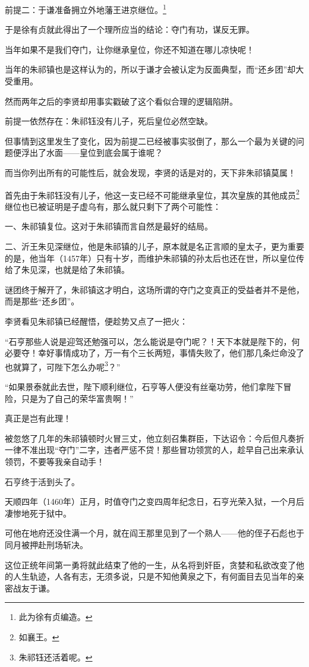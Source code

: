 \begin{multicols}{\theparacolNo}
前提二：于谦准备拥立外地藩王进京继位。\footnote{此为徐有贞编造。}

于是徐有贞就此得出了一个理所应当的结论：夺门有功，谋反无罪。

当年如果不是我们夺门，让你继承皇位，你还不知道在哪儿凉快呢！

当年的朱祁镇也是这样认为的，所以于谦才会被认定为反面典型，而“还乡团”却大受重用。

然而两年之后的李贤却用事实戳破了这个看似合理的逻辑陷阱。

前提一依然存在：朱祁钰没有儿子，死后皇位必然空缺。

但事情到这里发生了变化，因为前提二已经被事实驳倒了，那么一个最为关键的问题便浮出了水面——皇位到底会属于谁呢？

而当你列出所有的可能性后，就会发现，李贤的话是对的，天下非朱祁镇莫属！

首先由于朱祁钰没有儿子，他这一支已经不可能继承皇位，其次皇族的其他成员\footnote{如襄王。}继位也已被证明是子虚乌有，那么就只剩下了两个可能性：

一、朱祁镇复位。这对于朱祁镇而言自然是最好的结局。

二、沂王朱见深继位，他是朱祁镇的儿子，原本就是名正言顺的皇太子，更为重要的是，他当年（1457年）只有十岁，而维护朱祁镇的孙太后也还在世，所以皇位传给了朱见深，也就是给了朱祁镇。

谜团终于解开了，朱祁镇这才明白，这场所谓的夺门之变真正的受益者并不是他，而是那些“还乡团”。

李贤看见朱祁镇已经醒悟，便趁势又点了一把火：

“石亨那些人说是迎驾还勉强可以，怎么能说是夺门呢？！天下本就是陛下的，何必要夺！幸好事情成功了，万一有个三长两短，事情失败了，他们那几条烂命没了也就算了，可陛下怎么办呢\footnote{朱祁钰还活着呢。}？”

“如果景泰就此去世，陛下顺利继位，石亨等人便没有丝毫功劳，他们拿陛下冒险，只是为了自己的荣华富贵啊！”

真正是岂有此理！

被忽悠了几年的朱祁镇顿时火冒三丈，他立刻召集群臣，下达诏令：今后但凡奏折一律不准出现“夺门”二字，违者严惩不贷！那些冒功领赏的人，趁早自己出来承认领罚，不要等我亲自动手！

石亨终于活到头了。

天顺四年（1460年）正月，时值夺门之变四周年纪念日，石亨光荣入狱，一个月后凄惨地死于狱中。

可他在地府还没住满一个月，就在阎王那里见到了一个熟人——他的侄子石彪也于同月被押赴刑场斩决。

这位正统年间第一勇将就此结束了他的一生，从名将到奸臣，贪婪和私欲改变了他的人生轨迹，人各有志，无须多说，只是不知他黄泉之下，有何面目去见当年的亲密战友于谦。


\end{multicols}
